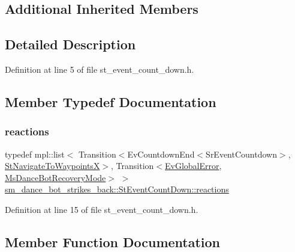 \subsection*{Additional Inherited Members}


\subsection{Detailed Description}


Definition at line 5 of file st\+\_\+event\+\_\+count\+\_\+down.\+h.



\subsection{Member Typedef Documentation}
\mbox{\label{structsm__dance__bot__strikes__back_1_1StEventCountDown_a854ccb5b93cb3e2a87fe02b0b4990016}} 
\subsubsection{\texorpdfstring{reactions}{reactions}}
{\footnotesize\ttfamily typedef mpl\+::list$<$ Transition$<$Ev\+Countdown\+End$<$Sr\+Event\+Countdown$>$, \hyperlink{structsm__dance__bot__strikes__back_1_1StNavigateToWaypointsX}{St\+Navigate\+To\+WaypointsX}$>$, Transition$<$\hyperlink{structsm__dance__bot__strikes__back_1_1EvGlobalError}{Ev\+Global\+Error}, \hyperlink{classsm__dance__bot__strikes__back_1_1MsDanceBotRecoveryMode}{Ms\+Dance\+Bot\+Recovery\+Mode}$>$ $>$ \hyperlink{structsm__dance__bot__strikes__back_1_1StEventCountDown_a854ccb5b93cb3e2a87fe02b0b4990016}{sm\+\_\+dance\+\_\+bot\+\_\+strikes\+\_\+back\+::\+St\+Event\+Count\+Down\+::reactions}}



Definition at line 15 of file st\+\_\+event\+\_\+count\+\_\+down.\+h.



\subsection{Member Function Documentation}
\mbox{\label{structsm__dance__bot__strikes__back_1_1StEventCountDown_a2b0d518bcc72065392d547d69c0dff7d}} 
